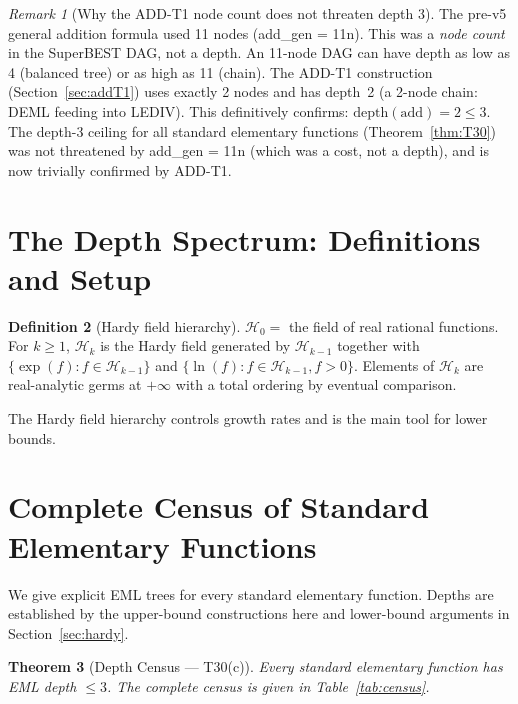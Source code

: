 \documentclass[12pt,a4paper]{article}
\newtheorem{theorem}{Theorem}[section]
\theoremstyle{definition}
\newtheorem{definition}[theorem]{Definition}
\theoremstyle{remark}
\newtheorem{remark}[theorem]{Remark}
\begin{document}
\begin{remark}[Why the ADD-T1 node count does not threaten depth 3]
\label{rem:add-depth}
The pre-v5 general addition formula used 11 nodes (add\_gen = 11n).
This was a \emph{node count} in the SuperBEST DAG, not a depth.
An 11-node DAG can have depth as low as 4 (balanced tree) or as high as 11 (chain).
The ADD-T1 construction (Section~\ref{sec:addT1}) uses exactly 2 nodes and has
depth~2 (a 2-node chain: DEML feeding into LEDIV).
This definitively confirms: $\mathrm{depth}(\mathrm{add}) = 2 \leq 3$.
The depth-3 ceiling for all standard elementary functions (Theorem~\ref{thm:T30})
was not threatened by add\_gen = 11n (which was a cost, not a depth), and is now
trivially confirmed by ADD-T1.
\end{remark}

\section{The Depth Spectrum: Definitions and Setup}
\label{sec:spectrum}

\begin{definition}[Hardy field hierarchy]\label{def:hardy}
$\mathcal{H}_0 = $ the field of real rational functions.  For $k \geq 1$,
$\mathcal{H}_k$ is the Hardy field generated by $\mathcal{H}_{k-1}$ together
with $\{\exp(f) : f \in \mathcal{H}_{k-1}\}$ and $\{\ln(f) : f \in \mathcal{H}_{k-1}, f > 0\}$.
Elements of $\mathcal{H}_k$ are real-analytic germs at $+\infty$ with a total ordering
by eventual comparison.
\end{definition}

The Hardy field hierarchy controls growth rates and is the main tool for lower bounds.

\section{Complete Census of Standard Elementary Functions}
\label{sec:census}

We give explicit EML trees for every standard elementary function. Depths are established
by the upper-bound constructions here and lower-bound arguments in Section~\ref{sec:hardy}.

\begin{theorem}[Depth Census --- T30(c)]\label{thm:census}
Every standard elementary function has EML depth $\leq 3$.
The complete census is given in Table~\ref{tab:census}.
\end{theorem}
\end{document}
